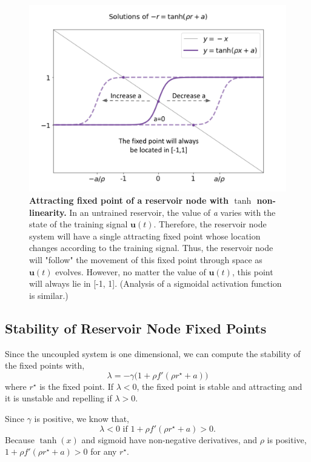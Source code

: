 \documentclass[journal]{journal}
\begin{document}
\begin{figure}[h] \label{tanh}
\includegraphics[scale=0.4]{Images/tanhfixed.png}
\caption{\textbf{Attracting fixed point of a reservoir node with $\tanh$ non-linearity.} In an untrained reservoir, the value of \textit{a} varies with the state of the training signal $\mathbf{u}(t)$. Therefore, the reservoir node system will have a single attracting fixed point whose location changes according to the training signal. Thus, the reservoir node will "follow" the movement of this fixed point through space as $\mathbf{u}(t)$ evolves. However, no matter the value of $\mathbf{u}(t)$, this point will always lie in [-1, 1]. (Analysis of a sigmoidal activation function is similar.)}
\end{figure}

\subsection{Stability of Reservoir Node Fixed Points}

Since the uncoupled system is one dimensional, we can compute the stability of the fixed points with,
\begin{equation}\label{stability}
\lambda = -\gamma\Big(1 + \rho f'(\rho r^\star + a) \Big)
\end{equation}
where $r^\star$ is the fixed point. If $\lambda < 0$, the fixed point is stable and attracting and it is unstable and repelling if $\lambda > 0$. 

Since $\gamma$ is positive, we know that,
 \[ 
 \lambda < 0 \,\,\text{if} \, \, 1 + \rho f'(\rho r^\star + a) > 0.
 \] 
Because $\tanh(x)$ and sigmoid have non-negative derivatives, and $\rho$ is positive, $1 + \rho f'(\rho r^\star + a) > 0$ for any $r^\star$. 
\end{document}
